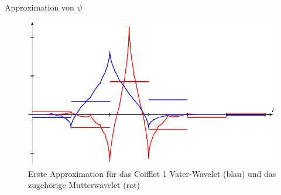 \begin{loesung}
\begin{teilaufgaben}
Approximation von $\psi$
\qedhere
\end{teilaufgaben}
\begin{figure}
\centering
\includegraphics{chapters/uebungsaufgaben/07001-graph.pdf}
%
%
\caption{Erste Approximation für das Coifflet 1 Vater-Wavelet (blau)
und das zugehörige Mutterwavelet (rot)
\label{07001:coifletimage}}
\end{figure}
\end{loesung}


